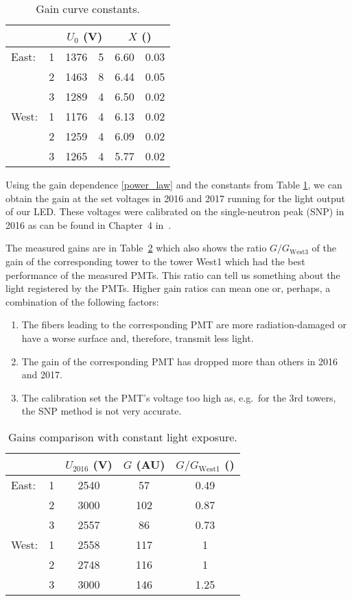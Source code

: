 \documentclass[a4paper,10pt]{article}
\begin{document}
\begin{table}[htb]
\caption{\label{gainTable}Gain curve constants.}
\begin{center}
\begin{tabular}{lcr@{ $\pm$ }lr@{ $\pm$ }l}
\toprule
&&\multicolumn{2}{c}{$U_0$ (V)}&\multicolumn{2}{c}{$X$ ()}\\
\midrule
East:&1&1376&5&6.60&0.03\\
     &2&1463&8&6.44&0.05\\
     &3&1289&4&6.50&0.02\\
\midrule
West:&1&1176&4&6.13&0.02\\
     &2&1259&4&6.09&0.02\\
     &3&1265&4&5.77&0.02\\
\bottomrule
\end{tabular}
\end{center}
\end{table}

Using the gain dependence \eqref{power_law} and the constants from Table \ref{gainTable}, we can obtain the gain at the set voltages in 2016 and 2017 running for the light output of our LED\@. These voltages were calibrated on the single-neutron peak (SNP) in 2016 as can be found in Chapter~4 in~\cite{ZDC_ops_manual}\@. 

The measured gains are in Table~\ref{glassTable} which also shows the ratio $G/G_\text{West3}$ of the gain of the corresponding tower to the tower West1 which had the best performance of the measured PMTs\@. This ratio can tell us something about the light registered by the PMTs. Higher gain ratios can mean one or, perhaps, a combination of the following factors:
\begin{enumerate}
\item The fibers leading to the corresponding PMT are more radiation-damaged or have a worse surface and, therefore, transmit less light.
\item The gain of the corresponding PMT has dropped more than others in 2016 and 2017.
\item The calibration set the PMT's voltage too high as, e.g.\ for the 3rd towers, the SNP method is not very accurate. 
\end{enumerate}


\begin{table}[htb]
\caption{\label{glassTable}Gains comparison with constant light exposure.}
\begin{center}
\begin{tabular}{lcccc}
\toprule
&&$U_\text{2016}$ (V)&$G$ (AU)& $G/G_\text{West1}$ ()\\
\midrule
East:&1&2540&57&0.49\\
&2&3000&102&0.87\\
&3&2557&86&0.73\\
\midrule
West:&1&2558&117&1\\
&2&2748&116&1\\
&3&3000&146&1.25\\
\bottomrule
\end{tabular}
\end{center}
\end{table}
\end{document}
